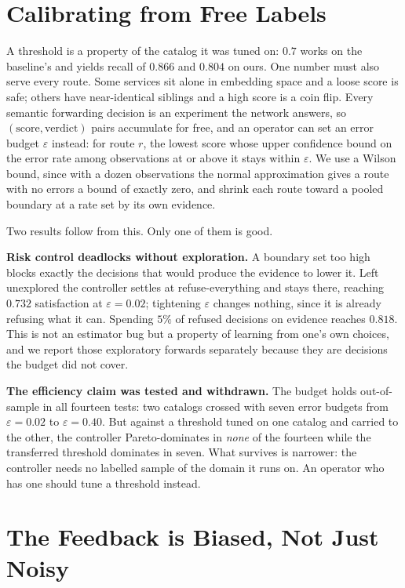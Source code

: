 \documentclass[conference,a4paper]{IEEEtran}
\begin{document}
\section{Calibrating from Free Labels}
\label{sec:risk}

A threshold is a property of the catalog it was tuned on: $0.7$ works on the
baseline's and yields recall of $0.866$ and $0.804$ on ours. One number must
also serve every route. Some services sit alone in embedding space and a
loose score is safe; others have near-identical siblings and a high score is
a coin flip. Every semantic forwarding decision
is an experiment the network answers, so $(\text{score},\text{verdict})$ pairs
accumulate for free, and an operator can set an error budget $\varepsilon$
instead: for route $r$, the lowest score whose upper confidence bound on the
error rate among observations at or above it stays within $\varepsilon$. We
use a Wilson bound, since with a dozen observations the normal approximation
gives a route with no errors a bound of exactly zero, and shrink each route
toward a pooled boundary at a rate set by its own evidence.

Two results follow from this. Only one of them is good.

\textbf{Risk control deadlocks without exploration.} A boundary set too high
blocks exactly the decisions that would produce the evidence to lower it.
Left unexplored the controller settles at refuse-everything and stays there,
reaching $0.732$ satisfaction at $\varepsilon=0.02$; tightening $\varepsilon$
changes nothing, since it is already refusing what it can. Spending $5\%$ of
refused decisions on evidence reaches $0.818$. This is not an estimator bug
but a property of learning from one's own choices, and we report those
exploratory forwards separately because they are decisions the budget did not
cover.

\textbf{The efficiency claim was tested and withdrawn.} The budget holds
out-of-sample in all fourteen tests: two catalogs crossed with seven error
budgets from $\varepsilon = 0.02$ to $\varepsilon = 0.40$. But against a
threshold tuned on one catalog and carried to the other, the controller
Pareto-dominates in \emph{none} of the fourteen while the transferred
threshold dominates in seven. What survives is narrower: the controller needs
no labelled sample of the domain it runs on. An operator who has one should
tune a threshold instead.

\section{The Feedback is Biased, Not Just Noisy}
\label{sec:bias}
\end{document}
